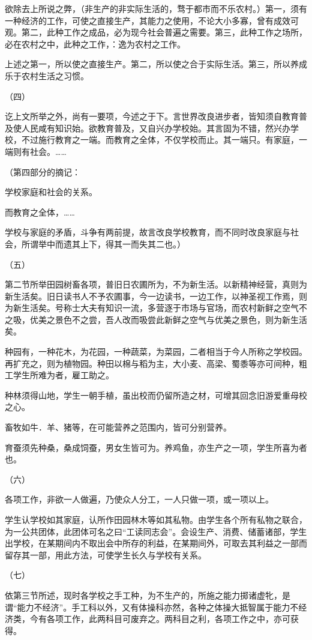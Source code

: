 欲除去上所说之弊，（非生产的非实际生活的，骛于都市而不乐农村。）第一，须有一种经济的工作，可使之直接生产，其能力之使用，不论大小多寡，曾有成效可观。第二，此种工作之成品，必为现今社会普遍之需要。第三，此种工作之场所，必在农村之中，此种之工作，：逸为农村之工作。

上述之第一，所以使之直接生产。第二，所以使之合于实际生活。第三，所以养成乐于农村生活之习惯。

（四）

讫上文所举之外，尚有一要项，今述之于下。言世界改良进步者，皆知须自教育普及使人民咸有知识始。欲教育普及，又自兴办学校始。其言固为不错，然兴办学校，不过施行教育之一端。而教育之全体，不仅学校而止。其一端只。有家庭，一端则有社会。……

（第四部分的摘记：

学校家庭和社会的关系。

而教育之全体，……

学校与家庭的矛盾，斗争有两前提，故言改良学校教育，而不同时改良家庭与社会，所谓举中而遗其上下，得其一而失其二也。）

（五）

第二节所举田园树畜各项，普旧日农圃所为，不为新生活。以新精神经营，真则为新生活矣。旧日读书人不予农圃事，今一边读书，一边工作，以神圣视工作焉，则为新生活矣。号称士大夫有知识一流，多营逐于市场与官场，而农村新鲜之空气不之吸，优美之景色不之尝，吾人改而吸尝此新鲜之空气与优美之景色，则为新生活矣。

种园有，一种花木，为花园，一种蔬菜，为菜园，二者相当于今人所称之学校园。再扩充之，则为植物园。种田以棉与稻为主，大小麦、高梁、蜀黍等亦可间种，粗工学生所难为者，雇工助之。

种林须得山地，学生一朝手植，虽出校而仍留所造之材，可增其回念旧游爱重母校之心。

畜牧如牛．羊、猪等，在可能营养之范围内，皆可分别营养。

育蚕须先种桑，桑成饲蚕，男女生皆可为。养鸡鱼，亦生产之一项，学生所喜为者也。

（六）

各项工作，非欲一人做遍，乃使众人分工，一人只做一项，或一项以上。

学生认学校如其家庭，认所作田园林木等如其私物。由学生各个所有私物之联合，为一公共团体，此团体可名之曰“工读同志会”。会设生产、消费、储蓄诸部，学生出学校，在某期间内不取出会中所存的利益，在某期间外，可取去其利益之一部而留存其一部，用此方法，可使学生长久与学校有关系。

（七）

依第三节所述，现时各学校之手工种，为不生产的，所施之能力掷诸虚牝，是谓“能力不经济”。手工科以外，又有体操科亦然，各种之体操大抵智属于能力不经济类，今有各项工作，此两科目可废弃之。两科目之利，各项工作之中，亦可获得。

